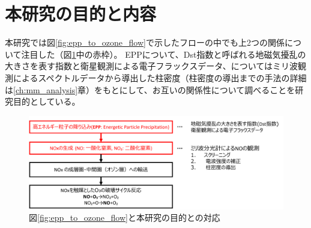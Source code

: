 \section{本研究の目的と内容}
\label{sec:intro_porpose}
本研究では図\ref{fig:epp_to_ozone_flow}で示したフローの中でも上2つの関係について注目した（図\ref{fig:flow_and_porpose}中の赤枠）。
EPPについて、Dst指数と呼ばれる地磁気擾乱の大きさを表す指数と衛星観測による電子フラックスデータ、についてはミリ波観測によるスペクトルデータから導出した柱密度（柱密度の導出までの手法の詳細は\ref{ch:mm_analysis}章）をもとにして、お互いの関係性について調べることを研究目的としている。
\begin{figure}[htbp]
    \centering
    \includegraphics[width=\linewidth]{master_thesis_contents/master_thesis_fig/flow_and_porpose.pdf}
    \caption{図\ref{fig:epp_to_ozone_flow}と本研究の目的との対応}
    \label{fig:flow_and_porpose}
\end{figure}
